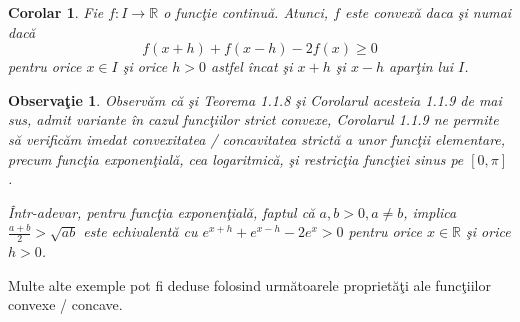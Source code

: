 \documentclass[a4paper,12pt,oneside]{report}
\newtheorem{remark}{Observa\c{t}ie}
\newtheorem{corollary}{Corolar}
\begin{document}
\begin{corollary}
Fie \(f: I \rightarrow \mathbb{R}\) o func\c{t}ie continu\u{a}. Atunci, \(f\) este convex\u{a} daca \c{s}i numai dac\u{a}
\begin{displaymath}
  f\left ( x+h \right )+ f\left ( x - h \right ) - 2f\left ( x \right )\geq 0
\end{displaymath}
pentru orice \(x \in I\) \c{s}i orice \(h > 0\) astfel \^{i}ncat \c{s}i \(x + h\) \c{s}i \(x - h\) apar\c{t}in lui \(I\).
\end{corollary}
\begin{remark}
Observ\u{a}m c\u{a} \c{s}i Teorema 1.1.8 \c{s}i Corolarul acesteia 1.1.9 de mai sus, admit variante \^{i}n cazul func\c{t}iilor strict convexe,
Corolarul 1.1.9 ne permite s\u{a} verific\u{a}m imedat convexitatea / concavitatea strict\u{a} a unor func\c{t}ii elementare, precum func\c{t}ia exponen\c{t}ial\u{a}, cea logaritmic\u{a}, \c{s}i restric\c{t}ia func\c{t}iei sinus pe \(\left [ 0 , \pi \right ]\).

\^{I}ntr-adevar, pentru func\c{t}ia exponen\c{t}ial\u{a}, faptul c\u{a}  \(a , b > 0, a\neq b\), implica \(\frac{a + b}{2}> \sqrt{ab}\)
este echivalent\u{a} cu
\(e^{x + h} + e^{x - h } - 2e^{x}> 0\)
pentru orice \(x\in \mathbb{R}\) \c{s}i orice \(h > 0\).
\end{remark}
	Multe alte exemple pot fi deduse folosind urm\u{a}toarele propriet\u{a}\c{t}i ale func\c{t}iilor convexe / concave.
\end{document}

